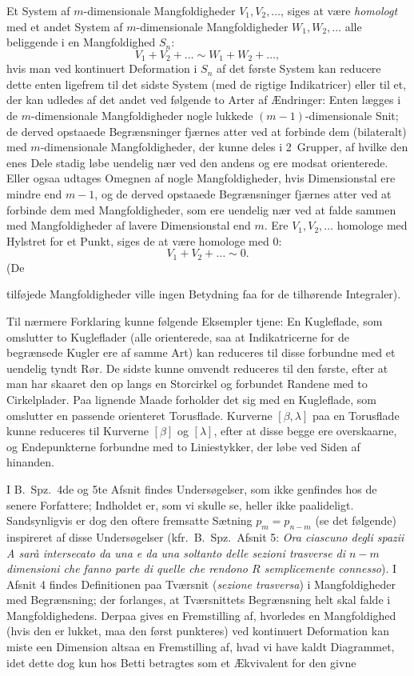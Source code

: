 \documentclass{article}
\begin{document}
Et System af $m$-dimensionale Mangfoldigheder $V_1, V_2, \dots$, siges at være \emph{homologt} med et andet System af $m$-dimensionale Mangfoldigheder $W_1, W_2, \dots$ alle beliggende i en Mangfoldighed $S_n$:
\[
V_1 + V_2 + \dots \sim W_1 + W_2 + \dots,
\]
hvis man ved kontinuert Deformation i $S_n$ af det første System kan reducere dette enten ligefrem til det sidste System (med de rigtige Indikatricer) eller til et, der kan udledes af det andet ved følgende to Arter af Ændringer: Enten lægges i de $m$-dimensionale Mangfoldigheder nogle lukkede $(m - 1)$-dimensionale Snit; de derved opstaaede Begrænsninger fjærnes atter ved at forbinde dem (bilateralt) med $m$-dimensionale Mangfoldigheder, der kunne deles i 2~Grupper, af hvilke den enes Dele stadig løbe uendelig nær ved den andens og ere modsat orienterede. Eller ogsaa udtages Omegnen af nogle Mangfoldigheder, hvis Dimensionstal ere mindre end $m - 1$, og de derved opstaaede Begrænsninger fjærnes atter ved at forbinde dem med Mangfoldigheder, som ere uendelig nær ved at falde sammen med Mangfoldigheder af lavere Dimensionstal end $m$. Ere $V_1, V_2, \dots$ homologe med Hylstret for et Punkt, siges de at være homologe med 0:
\[
V_1 + V_2 + \dots \sim 0.
\]
(De

tilføjede Mangfoldigheder ville ingen Betydning faa for de tilhørende Integraler).

Til nærmere Forklaring kunne følgende Eksempler tjene: En Kugleflade, som omslutter to Kugleflader (alle orienterede, saa at Indikatricerne for de begrænsede Kugler ere af samme Art) kan reduceres til disse forbundne med et uendelig tyndt Rør. De sidste kunne omvendt reduceres til den første, efter at man har skaaret den op langs en Storcirkel og forbundet Randene med to Cirkelplader. Paa lignende Maade forholder det sig med en Kugleflade, som omslutter en passende orienteret Torusflade. Kurverne $[\beta, \lambda]$ paa en Torusflade kunne reduceres til Kurverne $[\beta]$ og $[\lambda]$, efter at disse begge ere overskaarne, og Endepunkterne forbundne med to Liniestykker, der løbe ved Siden af hinanden.

I B.~Spz.\ 4de og 5te Afsnit findes Undersøgelser, som ikke genfindes hos de senere Forfattere; Indholdet er, som vi skulle se, heller ikke paalideligt. Sandsynligvis er dog den oftere fremsatte Sætning $p_m = p_{n-m}$ (se det følgende) inspireret af disse Undersøgelser (kfr.\ B.~Spz.\ Afsnit 5: \emph{Ora ciascuno degli spazii A sarà intersecato da una e da una soltanto delle sezioni trasverse di $n - m$ dimensioni che fanno parte di quelle che rendono $R$ semplicemente connesso}). I Afsnit 4 findes Definitionen paa Tværsnit (\emph{sezione trasversa}) i Mangfoldigheder med Begrænsning; der forlanges, at Tværsnittets Begrænsning helt skal falde i Mangfoldighedens. Derpaa gives en Fremstilling af, hvorledes en Mangfoldighed (hvis den er lukket, maa den først punkteres) ved kontinuert Deformation kan miste een Dimension altsaa en Fremstilling af, hvad vi have kaldt Diagrammet, idet dette dog kun hos Betti betragtes som et Ækvivalent for den givne
\end{document}
